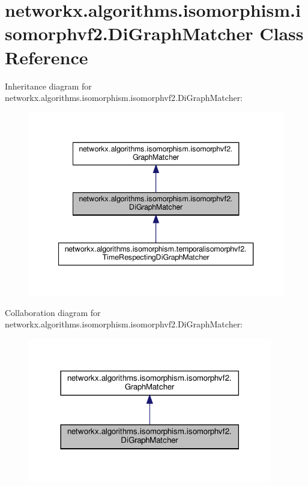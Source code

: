 \hypertarget{classnetworkx_1_1algorithms_1_1isomorphism_1_1isomorphvf2_1_1DiGraphMatcher}{}\section{networkx.\+algorithms.\+isomorphism.\+isomorphvf2.\+Di\+Graph\+Matcher Class Reference}
\label{classnetworkx_1_1algorithms_1_1isomorphism_1_1isomorphvf2_1_1DiGraphMatcher}


Inheritance diagram for networkx.\+algorithms.\+isomorphism.\+isomorphvf2.\+Di\+Graph\+Matcher\+:
\nopagebreak
\begin{figure}[H]
\begin{center}
\leavevmode
\includegraphics[width=340pt]{classnetworkx_1_1algorithms_1_1isomorphism_1_1isomorphvf2_1_1DiGraphMatcher__inherit__graph}
\end{center}
\end{figure}


Collaboration diagram for networkx.\+algorithms.\+isomorphism.\+isomorphvf2.\+Di\+Graph\+Matcher\+:
\nopagebreak
\begin{figure}[H]
\begin{center}
\leavevmode
\includegraphics[width=302pt]{classnetworkx_1_1algorithms_1_1isomorphism_1_1isomorphvf2_1_1DiGraphMatcher__coll__graph}
\end{center}
\end{figure}
